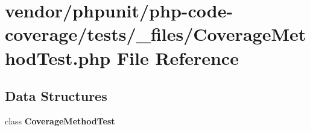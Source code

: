 \section{vendor/phpunit/php-\/code-\/coverage/tests/\+\_\+files/\+Coverage\+Method\+Test.php File Reference}
\label{php-code-coverage_2tests_2__files_2_coverage_method_test_8php}
\subsection*{Data Structures}
\begin{DoxyCompactItemize}
\item 
class {\bf Coverage\+Method\+Test}
\end{DoxyCompactItemize}
